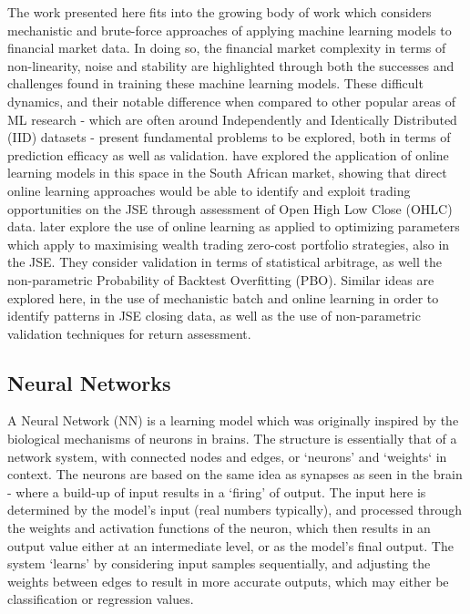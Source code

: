 \documentclass[a4paper,11pt,oneside]{article}
\theoremstyle{plain}
\theoremstyle{definition}
\begin{document}
	The work presented here fits into the growing body of work which considers mechanistic and brute-force approaches of applying 
	machine learning models to financial market data. In doing so, the financial market complexity in terms of non-linearity, noise and stability are highlighted through 
	both the successes and challenges found in training these machine learning models. These difficult dynamics, and their notable difference when 
	compared to other popular areas of ML research - which are often around Independently and Identically Distributed (IID) datasets - present fundamental problems to be explored, both 
	in terms of prediction efficacy as well as validation. \citet{Loonat} have explored the application of online learning models in this space
	 in the South African market, showing that direct online learning approaches would be able to identify and exploit trading opportunities on the JSE through assessment 
	 of Open High Low Close (OHLC) data. \citet{MurphyGebbie} later explore the use of online learning as applied to optimizing parameters which apply to maximising wealth trading zero-cost portfolio strategies, also in the JSE. They consider validation in terms of statistical arbitrage, as well the non-parametric Probability of Backtest Overfitting (PBO). Similar ideas are explored here, in the use of mechanistic batch and online learning in order to identify patterns in JSE closing data, as well as the use of non-parametric validation techniques for return assessment.
	
	\subsection{Neural Networks}\label{lr_nn}
	
	A Neural Network (NN) is a learning model which was originally inspired by the biological mechanisms of neurons 
	in brains. The structure is essentially that of a network system, with connected nodes and edges, or `neurons’ and 
	‘weights‘ in context. The neurons are based on the same idea as synapses as seen in the brain - where a build-up 
	of input results in a ‘firing’ of output. The input here is determined by the model's input (real numbers typically), 
	and processed through the weights and activation functions of the neuron, which then results in an output value 
	either at an intermediate level, or as the model's final output. The system ‘learns’ by considering input samples 
	sequentially, and adjusting the weights between edges to result in more accurate outputs, which may either be 
	classification or regression values. 
	\hfill \break 
	
\end{document}
